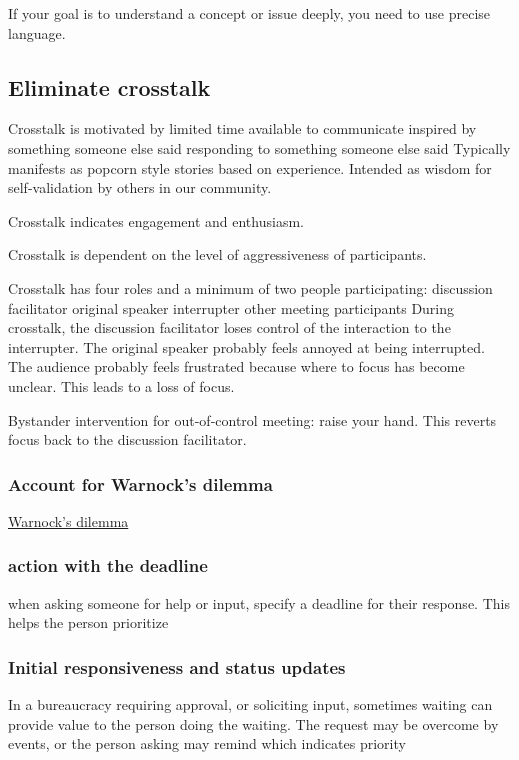 If your goal is to understand a concept or issue deeply, you need to use precise language.


\subsection{Eliminate crosstalk}

Crosstalk is motivated by
limited time available to communicate
inspired by something someone else said
responding to something someone else said
Typically manifests as popcorn style stories based on experience. Intended as wisdom for self-validation by others in our community. 

Crosstalk indicates engagement and enthusiasm. 

Crosstalk is dependent on the level of aggressiveness of participants.

Crosstalk has four roles and a minimum of two people participating:
discussion facilitator
original speaker
interrupter
other meeting participants
During crosstalk, the discussion facilitator loses control of the interaction to the interrupter. The original speaker probably feels annoyed at being interrupted. The audience probably feels frustrated because where to focus has become unclear. This leads to a loss of focus. 

Bystander intervention for out-of-control meeting: raise your hand. This reverts focus back to the discussion facilitator. 

\subsubsection{Account for Warnock's dilemma}
\href{https://en.wikipedia.org/wiki/Warnock\%27s_dilemma}{Warnock's dilemma}

\subsubsection{action with the deadline}

when asking someone for help or input, specify a deadline for their response. This helps the person prioritize


\subsubsection{Initial responsiveness and status updates}
In a bureaucracy requiring approval, or soliciting input, sometimes waiting can provide value to the person doing the waiting. The request may be overcome by events, or the person asking may remind which indicates priority

